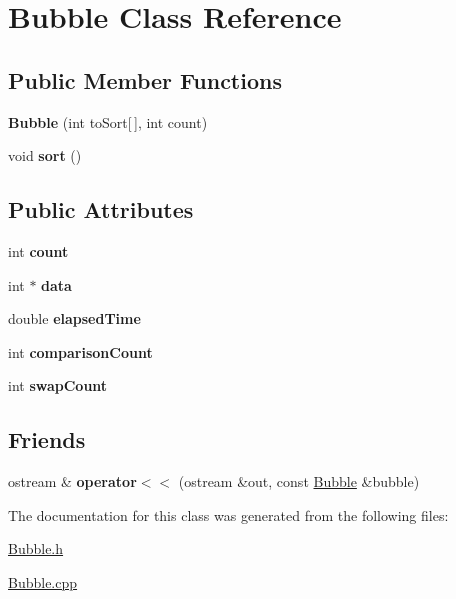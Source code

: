 \hypertarget{class_bubble}{}\section{Bubble Class Reference}
\label{class_bubble}
\subsection*{Public Member Functions}
\begin{DoxyCompactItemize}
\item 
\hypertarget{class_bubble_ad976ff7a36c7c3a46426cfc9f3500a69}{}\label{class_bubble_ad976ff7a36c7c3a46426cfc9f3500a69} 
{\bfseries Bubble} (int to\+Sort\mbox{[}$\,$\mbox{]}, int count)
\item 
\hypertarget{class_bubble_a65cd5151d8d3bfa6486aac54559d4242}{}\label{class_bubble_a65cd5151d8d3bfa6486aac54559d4242} 
void {\bfseries sort} ()
\end{DoxyCompactItemize}
\subsection*{Public Attributes}
\begin{DoxyCompactItemize}
\item 
\hypertarget{class_bubble_a7f5a67a64e6cfece00b9e5e9ec9bdfd8}{}\label{class_bubble_a7f5a67a64e6cfece00b9e5e9ec9bdfd8} 
int {\bfseries count}
\item 
\hypertarget{class_bubble_a7c2c89b2a7fb180127c1efd60cdc6e3f}{}\label{class_bubble_a7c2c89b2a7fb180127c1efd60cdc6e3f} 
int $\ast$ {\bfseries data}
\item 
\hypertarget{class_bubble_ab85f5de2d538d2c4a59db8a5aaede39d}{}\label{class_bubble_ab85f5de2d538d2c4a59db8a5aaede39d} 
double {\bfseries elapsed\+Time}
\item 
\hypertarget{class_bubble_a701ba37eaeeb479d3cb63cab1f04dca3}{}\label{class_bubble_a701ba37eaeeb479d3cb63cab1f04dca3} 
int {\bfseries comparison\+Count}
\item 
\hypertarget{class_bubble_a4c64b54462bc9a889695138e48e92392}{}\label{class_bubble_a4c64b54462bc9a889695138e48e92392} 
int {\bfseries swap\+Count}
\end{DoxyCompactItemize}
\subsection*{Friends}
\begin{DoxyCompactItemize}
\item 
\hypertarget{class_bubble_a89d4ab451f6aec4776036c26cdbe64c3}{}\label{class_bubble_a89d4ab451f6aec4776036c26cdbe64c3} 
ostream \& {\bfseries operator$<$$<$} (ostream \&out, const \hyperlink{class_bubble}{Bubble} \&bubble)
\end{DoxyCompactItemize}


The documentation for this class was generated from the following files\+:\begin{DoxyCompactItemize}
\item 
\hyperlink{_bubble_8h}{Bubble.\+h}\item 
\hyperlink{_bubble_8cpp}{Bubble.\+cpp}\end{DoxyCompactItemize}
